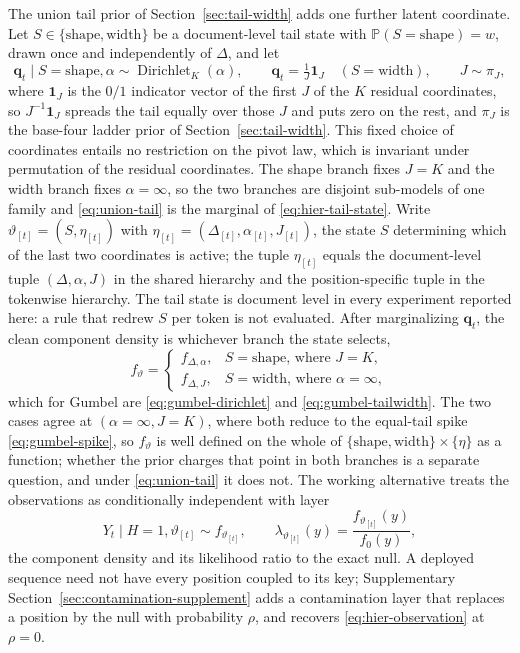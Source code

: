 \documentclass[11pt]{article}
\newcommand{\Prb}{\mathbb P}
\newcommand{\ind}{\mathbf 1}
\begin{document}
The union tail prior of Section~\ref{sec:tail-width} adds one further latent coordinate.  Let $S\in\{\mathrm{shape},\mathrm{width}\}$ be a document-level tail state with $\Prb(S=\mathrm{shape})=w$, drawn once and independently of $\Delta$, and let
\begin{equation}
  \bm q_t\mid S=\mathrm{shape},\alpha\sim\operatorname{Dirichlet}_K(\alpha),
  \qquad
  \bm q_t=\tfrac1J\ind_J\quad(S=\mathrm{width}),
  \qquad J\sim\pi_J,
  \label{eq:hier-tail-state}
\end{equation}
where $\ind_J$ is the $0/1$ indicator vector of the first $J$ of the $K$ residual coordinates, so $J^{-1}\ind_J$ spreads the tail equally over those $J$ and puts zero on the rest, and $\pi_J$ is the base-four ladder prior of Section~\ref{sec:tail-width}.  This fixed choice of coordinates entails no restriction on the pivot law, which is invariant under permutation of the residual coordinates.  The shape branch fixes $J=K$ and the width branch fixes $\alpha=\infty$, so the two branches are disjoint sub-models of one family and \eqref{eq:union-tail} is the marginal of \eqref{eq:hier-tail-state}.  Write $\vartheta_{[t]}=(S,\eta_{[t]})$ with $\eta_{[t]}=(\Delta_{[t]},\alpha_{[t]},J_{[t]})$, the state $S$ determining which of the last two coordinates is active; the tuple $\eta_{[t]}$ equals the document-level tuple $(\Delta,\alpha,J)$ in the shared hierarchy and the position-specific tuple in the tokenwise hierarchy.  The tail state is document level in every experiment reported here: a rule that redrew $S$ per token is not evaluated.  After marginalizing $\bm q_t$, the clean component density is whichever branch the state selects,
\begin{equation}
  f_{\vartheta}
  =\begin{cases}
    f_{\Delta,\alpha}, & S=\mathrm{shape}\text{, where }J=K,\\
    f_{\Delta,J},      & S=\mathrm{width}\text{, where }\alpha=\infty,
  \end{cases}
  \label{eq:branch-density}
\end{equation}
which for Gumbel are \eqref{eq:gumbel-dirichlet} and \eqref{eq:gumbel-tailwidth}.  The two cases agree at $(\alpha=\infty,J=K)$, where both reduce to the equal-tail spike \eqref{eq:gumbel-spike}, so $f_\vartheta$ is well defined on the whole of $\{\mathrm{shape},\mathrm{width}\}\times\{\eta\}$ as a function; whether the prior charges that point in both branches is a separate question, and under \eqref{eq:union-tail} it does not.  The working alternative treats the observations as conditionally independent with layer
\begin{equation}
  Y_t\mid H=1,\vartheta_{[t]}\sim f_{\vartheta_{[t]}},
  \qquad
  \lambda_{\vartheta_{[t]}}(y)=\frac{f_{\vartheta_{[t]}}(y)}{f_0(y)},
  \label{eq:hier-observation}
\end{equation}
the component density and its likelihood ratio to the exact null.  A deployed
sequence need not have every position coupled to its key;
Supplementary Section~\ref{sec:contamination-supplement} adds a contamination layer that
replaces a position by the null with probability $\rho$, and recovers
\eqref{eq:hier-observation} at $\rho=0$.
\end{document}
